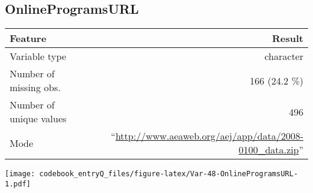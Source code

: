 \documentclass[]{article}
\newcommand{\bminione}{\begin{minipage}{0.75 \textwidth}}
\newcommand{\bminitwo}{\begin{minipage}{0.25 \textwidth}}
\newcommand{\emini}{\end{minipage}}
\begin{document}
\hypertarget{onlineprogramsurl}{\subsection{OnlineProgramsURL}\label{onlineprogramsurl}}

\bminione

\begin{longtable}[]{@{}lr@{}}
\toprule
\begin{minipage}[b]{0.29\columnwidth}\raggedright\strut
Feature\strut
\end{minipage} & \begin{minipage}[b]{0.65\columnwidth}\raggedleft\strut
Result\strut
\end{minipage}\tabularnewline
\midrule
\endhead
\begin{minipage}[t]{0.29\columnwidth}\raggedright\strut
Variable type\strut
\end{minipage} & \begin{minipage}[t]{0.65\columnwidth}\raggedleft\strut
character\strut
\end{minipage}\tabularnewline
\begin{minipage}[t]{0.29\columnwidth}\raggedright\strut
Number of missing obs.\strut
\end{minipage} & \begin{minipage}[t]{0.65\columnwidth}\raggedleft\strut
166 (24.2 \%)\strut
\end{minipage}\tabularnewline
\begin{minipage}[t]{0.29\columnwidth}\raggedright\strut
Number of unique values\strut
\end{minipage} & \begin{minipage}[t]{0.65\columnwidth}\raggedleft\strut
496\strut
\end{minipage}\tabularnewline
\begin{minipage}[t]{0.29\columnwidth}\raggedright\strut
Mode\strut
\end{minipage} & \begin{minipage}[t]{0.65\columnwidth}\raggedleft\strut
``\url{http://www.aeaweb.org/aej/app/data/2008-0100_data.zip}''\strut
\end{minipage}\tabularnewline
\bottomrule
\end{longtable}

\emini
\bminitwo
\texttt{[image: codebook\_entryQ\_files/figure-latex/Var-48-OnlineProgramsURL-1.pdf]}
\emini
\end{document}
